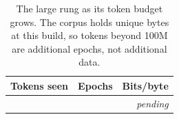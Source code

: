 \begin{table}[htbp]
\centering
\caption{The large rung as its token budget grows. The corpus holds
\CorpusTokens{} unique bytes at this build, so tokens beyond 100M are additional
epochs, not additional data.}
\label{tab:e2}
\begin{tabular}{rrr}
\toprule
Tokens seen & Epochs & Bits/byte \\
\midrule
& & \emph{pending} \\
\bottomrule
\end{tabular}
\end{table}
